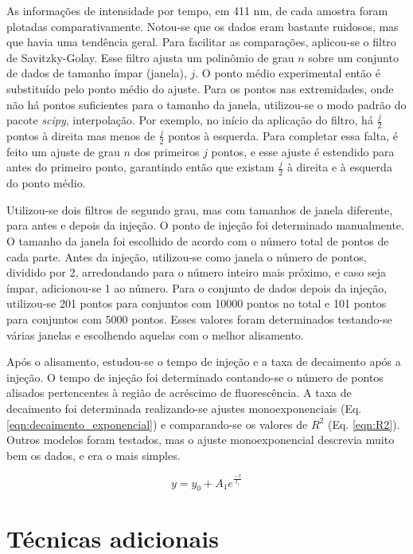 			As informações de intensidade por tempo, em 411 nm, de cada amostra foram plotadas comparativamente. Notou-se que os dados eram bastante ruidosos, mas que havia uma tendência geral. Para facilitar as comparações, aplicou-se o filtro de Savitzky-Golay. Esse filtro ajusta um polinômio de grau \(n\) sobre um conjunto de dados de tamanho ímpar (janela), \(j\). O ponto médio experimental então é substituído pelo ponto médio do ajuste. Para os pontos nas extremidades, onde não há pontos suficientes para o tamanho da janela, utilizou-se o modo padrão do pacote \emph{scipy}, interpolação. Por exemplo, no início da aplicação do filtro, há \(\frac{j}{2}\) pontos à direita mas menos de \(\frac{j}{2}\) pontos à esquerda. Para completar essa falta, é feito um ajuste de grau \(n\) dos primeiros \(j\) pontos, e esse ajuste é estendido para antes do primeiro ponto, garantindo então que existam \(\frac{j}{2}\) à direita e à esquerda do ponto médio.
			
			Utilizou-se dois filtros de segundo grau, mas com tamanhos de janela diferente, para antes e depois da injeção. O ponto de injeção foi determinado manualmente. O tamanho da janela foi escolhido de acordo com o número total de pontos de cada parte. Antes da injeção, utilizou-se como janela o número de pontos, dividido por 2, arredondando para o número inteiro mais próximo, e caso seja ímpar, adicionou-se 1 ao número. Para o conjunto de dados depois da injeção, utilizou-se 201 pontos para conjuntos com 10000 pontos no total e 101 pontos para conjuntos com 5000 pontos. Esses valores foram determinados testando-se várias janelas e escolhendo aquelas com o melhor alisamento.
			
			Após o alisamento, estudou-se o tempo de injeção e a taxa de decaimento após a injeção. O tempo de injeção foi determinado contando-se o número de pontos alisados pertencentes à região de acréscimo de fluorescência. A taxa de decaimento foi determinada realizando-se ajustes monoexponenciais (Eq. \ref{eqn:decaimento_exponencial}) e comparando-se os valores de \(R^2\) (Eq. \ref{eqn:R2}). Outros modelos foram testados, mas o ajuste monoexponencial descrevia muito bem os dados, e era o mais simples.
			
			\begin{equation}
				y = y_0 + A_1 e^{\frac{-x}{t_1}}
				\label{eqn:decaimento_exponencial}
			\end{equation}
			
	\chapter{Técnicas adicionais}
